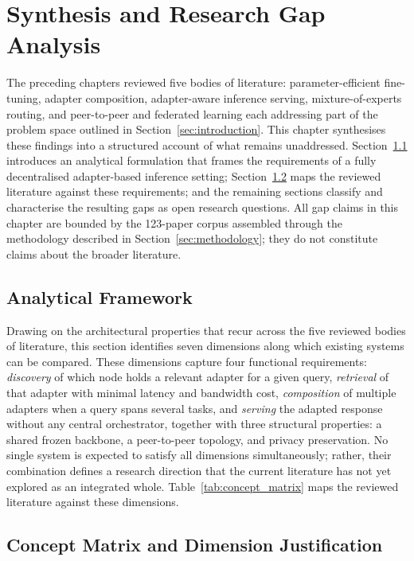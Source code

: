\section{Synthesis and Research Gap Analysis}
\label{sec:synthesis_gap}

The preceding chapters reviewed five bodies of literature: parameter-efficient
fine-tuning, adapter composition, adapter-aware inference serving,
mixture-of-experts routing, and peer-to-peer and federated learning each
addressing part of the problem space outlined in
Section~\ref{sec:introduction}. This chapter synthesises these findings into a
structured account of what remains unaddressed. Section~\ref{sec:synthesis_gap:formulation}
introduces an analytical formulation that frames the requirements of a fully
decentralised adapter-based inference setting; Section~\ref{sec:synthesis_gap:matrix}
maps the reviewed literature against these requirements; and the remaining
sections classify and characterise the resulting gaps as open research questions. All gap claims in this chapter are bounded by the 123-paper corpus assembled through the methodology described in Section~\ref{sec:methodology}; they do not constitute claims about the broader literature.

\subsection{Analytical Framework}
\label{sec:synthesis_gap:formulation}

Drawing on the architectural properties that recur across the five reviewed bodies of literature, this section identifies seven dimensions along which existing systems can be compared. These dimensions capture four functional requirements: \textit{discovery} of which node holds a relevant adapter for a given query, \textit{retrieval} of that adapter with minimal latency and bandwidth cost, \textit{composition} of multiple adapters when a query spans several tasks, and \textit{serving} the adapted response without any central orchestrator, together with three structural properties: a shared frozen backbone, a peer-to-peer topology, and privacy preservation. No single system is expected to satisfy all dimensions simultaneously; rather, their combination defines a research direction that the current literature has not yet explored as an integrated whole. Table~\ref{tab:concept_matrix} maps the reviewed literature against these dimensions.

\subsection{Concept Matrix and Dimension Justification}
\label{sec:synthesis_gap:matrix}

